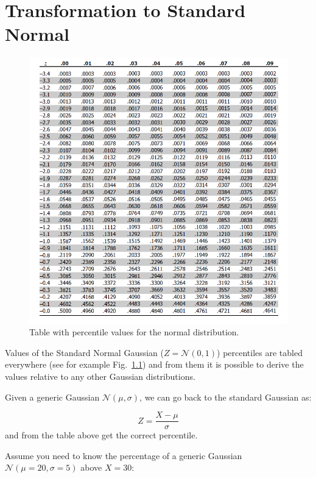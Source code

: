 \chapter{Transformation to Standard Normal}
\label{transformation-to-standard-normal}

\begin{figure}[tb]
\centering
\includegraphics[width=1.\textwidth]{figures/norm_gauss_percentile}
\caption{Table with percentile values for the normal distribution.}
\label{fig:normpercentile}
\end{figure}

Values of the Standard Normal Gaussian (\(Z = \mathcal{N}(0,1)\)) percentiles are tabled everywhere (see for example Fig.~\ref{fig:normpercentile}) and from them it is possible to derive the values relative to any other Gaussian distributions.

Given a generic Gaussian \(\mathcal{N}(\mu , \sigma)\), we can go back to the standard Gaussian as:

\begin{equation}
Z = \frac{X-\mu}{\sigma}
\end{equation}
and from the table above get the correct percentile.

Assume you need to know the percentage of a generic Gaussian \(\mathcal{N}(\mu=20 ,\sigma=5)\) above \(X=30\):

